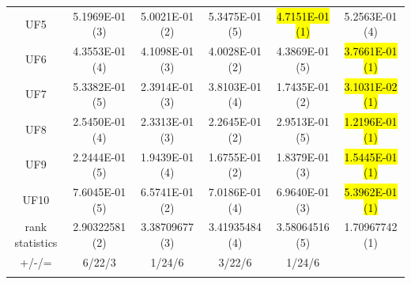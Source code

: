 \documentclass[journal]{IEEEtran}
\begin{document}
\begin{table}[tbp]
\begin{tabular}{cccccc}
    UF5             & 5.1969E-01 (3)      & 5.0021E-01 (2)      & 5.3475E-01 (5)    & \hl{4.7151E-01 (1)} & 5.2563E-01 (4)      \\
    UF6             & 4.3553E-01 (4)      & 4.1098E-01 (3)      & 4.0028E-01 (2)    & 4.3869E-01 (5)      & \hl{3.7661E-01 (1)} \\
    UF7             & 5.3382E-01 (5)      & 2.3914E-01 (3)      & 3.8103E-01 (4)    & 1.7435E-01 (2)      & \hl{3.1031E-02 (1)} \\
    UF8             & 2.5450E-01 (4)      & 2.3313E-01 (3)      & 2.2645E-01 (2)    & 2.9513E-01 (5)      & \hl{1.2196E-01 (1)} \\
    UF9             & 2.2444E-01 (5)      & 1.9439E-01 (4)      & 1.6755E-01 (2)    & 1.8379E-01 (3)      & \hl{1.5445E-01 (1)} \\
    UF10            & 7.6045E-01 (5)      & 6.5741E-01 (2)      & 7.0186E-01 (4)    & 6.9640E-01 (3)      & \hl{5.3962E-01 (1)} \\
    \hline
    rank statistics & 2.90322581 (2)      & 3.38709677 (3)      & 3.41935484 (4)    & 3.58064516 (5)      & 1.70967742 (1)      \\
    \hline
    +/-/=           & 6/22/3              & 1/24/6              & 3/22/6            & 1/24/6              &                     \\
    \bottomrule
    \label{tab:igd_ops}
  \end{tabular}
\end{table}
\end{document}
